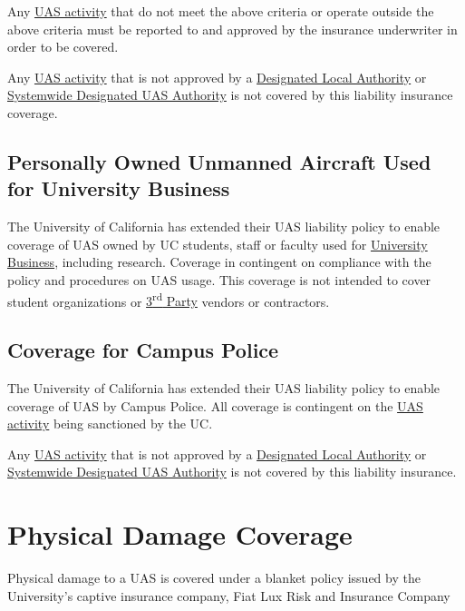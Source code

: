 \documentclass[
]{book}
\begin{document}
Any \protect\hyperlink{UASactivity}{UAS activity} that do not meet the above criteria or operate outside the above criteria must be reported to and approved by the insurance underwriter in order to be covered.

Any \protect\hyperlink{UASactivity}{UAS activity} that is not approved by a \protect\hyperlink{DLA}{Designated Local Authority} or \protect\hyperlink{SDA}{Systemwide Designated UAS Authority} is not covered by this liability insurance coverage.

\hypertarget{ss-personally-owned-UAS-coverage}{%
\subsection{Personally Owned Unmanned Aircraft Used for University Business}\label{ss-personally-owned-UAS-coverage}}

The University of California has extended their UAS liability policy to enable coverage of UAS owned by UC students, staff or faculty used for \protect\hyperlink{UB}{University Business}, including research. Coverage in contingent on compliance with the policy and procedures on UAS usage. This coverage is not intended to cover student organizations or \protect\hyperlink{rdparty}{3\textsuperscript{rd} Party} vendors or contractors.

\hypertarget{ss-campus-police-coverage}{%
\subsection{Coverage for Campus Police}\label{ss-campus-police-coverage}}

The University of California has extended their UAS liability policy to enable coverage of UAS by Campus Police. All coverage is contingent on the \protect\hyperlink{UASactivity}{UAS activity} being sanctioned by the UC.

Any \protect\hyperlink{UASactivity}{UAS activity} that is not approved by a \protect\hyperlink{DLA}{Designated Local Authority} or \protect\hyperlink{SDA}{Systemwide Designated UAS Authority} is not covered by this liability insurance.

\hypertarget{s-UC-physical-damage}{%
\section{Physical Damage Coverage}\label{s-UC-physical-damage}}

Physical damage to a UAS is covered under a blanket policy issued by the University's captive insurance company, Fiat Lux Risk and Insurance Company
\end{document}
